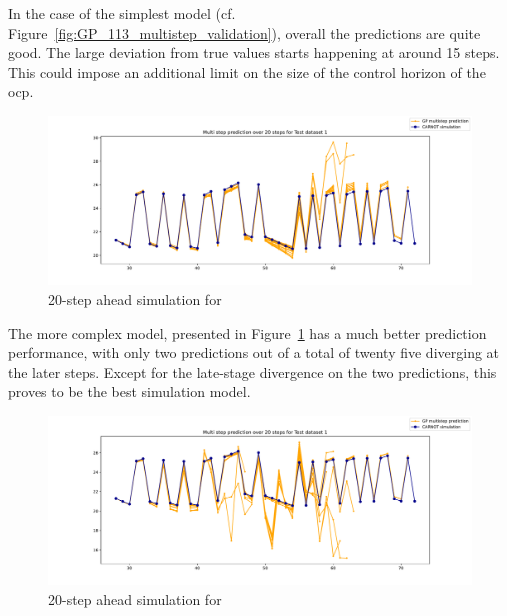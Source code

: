 In the case of the simplest model (cf.
Figure~\ref{fig:GP_113_multistep_validation}), overall the predictions are quite
good. The large deviation from true values starts happening at around 15 steps.
This could impose an additional limit on the size of the control horizon of the
\acrlong{ocp}.

\begin{figure}[ht]
    \centering
    \includegraphics[width =
    \textwidth]{Plots/GP_213_-1pts_test_prediction_20_steps.pdf}
    \vspace{-25pt}
    \caption{20-step ahead simulation for }
    \label{fig:GP_213_multistep_validation}
\end{figure}

The more complex model, presented in
Figure~\ref{fig:GP_213_multistep_validation} has a much better prediction
performance, with only two predictions out of a total of twenty five diverging
at the later steps. Except for the late-stage divergence on the two predictions,
this proves to be the best simulation model.

\begin{figure}[ht]
    \centering
    \includegraphics[width =
    \textwidth]{Plots/GP_313_-1pts_test_prediction_20_steps.pdf}
    \vspace{-25pt}
    \caption{20-step ahead simulation for }
    \label{fig:GP_313_multistep_validation}
\end{figure}

